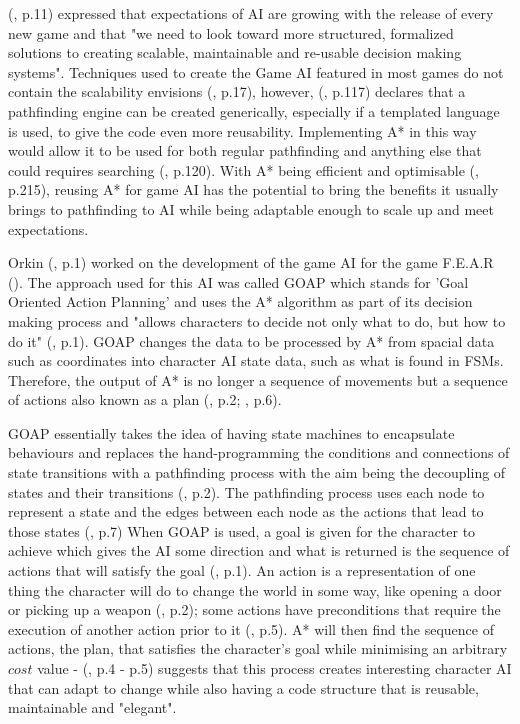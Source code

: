 \documentclass[11pt, a4paper]{article}
\begin{document}
\citeauthor{orkin2003applying} (\citeyear{orkin2003applying}, p.11) expressed that expectations of AI are growing with the release of every new game and that "we need to look toward more structured, formalized solutions to creating scalable, maintainable and re-usable decision making systems". Techniques used to create the Game AI featured in most games do not contain the scalability \citeauthor{orkin2003applying} envisions (\cite{laird2001human}, p.17), however, \citeauthor{higgins2002generic} (\citeyear{higgins2002generic}, p.117) declares that a pathfinding engine can be created generically, especially if a templated language is used, to give the code even more reusability. Implementing A* in this way would allow it to be used for both regular pathfinding and anything else that could requires searching (\cite{higgins2002generic}, p.120). With A* being efficient and optimisable (\cite{millington2019ai}, p.215), reusing A* for game AI has the potential to bring the benefits it usually brings to pathfinding to AI while being adaptable enough to scale up and meet expectations.

Orkin (\citeyear{orkin2006three}, p.1) worked on the development of the game AI for the game F.E.A.R (\cite{FEAR}). The approach used for this AI was called GOAP which stands for 'Goal Oriented Action Planning' and uses the A* algorithm as part of its decision making process and "allows characters to decide not only what to do, but how to do it" (\cite{orkin2003applying}, p.1). GOAP changes the data to be processed by A* from spacial data such as coordinates into character AI state data, such as what is found in FSMs. Therefore, the output of A* is no longer a sequence of movements but a sequence of actions also known as a plan (\cite{orkin2003applying}, p.2; \cite{tozour2002evolution}, p.6).

GOAP essentially takes the idea of having state machines to encapsulate behaviours and replaces the hand-programming the conditions and connections of state transitions with a pathfinding process with the aim being the decoupling of states and their transitions (\cite{orkin2003applying}, p.2). The pathfinding process uses each node to represent a state and the edges between each node as the actions that lead to those states (\cite{orkin2003applying}, p.7) When GOAP is used, a goal is given for the character to achieve which gives the AI some direction and what is returned is the sequence of actions that will satisfy the goal (\cite{orkin2003applying}, p.1). An action is a representation of one thing the character will do to change the world in some way, like opening a door or picking up a weapon (\cite{orkin2003applying}, p.2); some actions have preconditions that require the execution of another action prior to it (\cite{orkin2003applying}, p.5). A* will then find the sequence of actions, the plan, that satisfies the character's goal while minimising an arbitrary $cost$ value - \citeauthor{orkin2003applying} (\citeyear{orkin2003applying}, p.4 - p.5) suggests that this process creates interesting character AI that can adapt to change while also having a code structure that is reusable, maintainable and "elegant".
\end{document}
